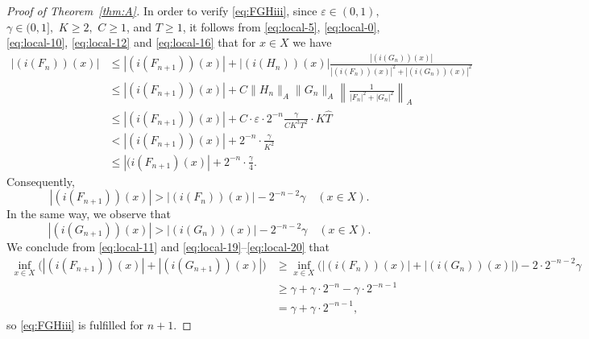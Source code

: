 \documentclass[12pt,fleqn]{amsart}
\theoremstyle{definition}
\numberwithin{equation}{section}
\theoremstyle{remark}
\newcommand{\e}{\varepsilon}
\begin{document}
\begin{proof}[Proof of Theorem~\ref{thm:A}]
In order to verify \eqref{eq:FGHiii}, since $\e \in(0,1),$  $\gamma \in(0,1],$ $K \geqslant 2,$ $C\geqslant 1$, and $T\geqslant 1$,
it follows from \eqref{eq:local-5}, \eqref{eq:local-0},
\eqref{eq:local-10}, \eqref{eq:local-12} and \eqref{eq:local-16} that for $x\in X$ we have
%
\begin{equation*}
    \begin{split}
        |(i(F_n))(x)|
        &\leq
        |(i(F_{n+1}))(x)|+|(i(H_n))(x)|\frac{|(i(G_n))(x)|}{|(i(F_n))(x)|^2+|(i(G_n))(x)|^2}\\
        &\leqslant 
        |(i(F_{n+1}))(x)|+ C\|H_n\|_A\|G_n\|_A
        \left\|\frac{1}{|F_n|^2+|G_n|^2}\right\|_A
        \\
        &\leqslant 
        |(i(F_{n+1}))(x)|+
        C \cdot \e\cdot 2^{-n}\frac{\gamma}{CK^3T^2}\cdot K\widehat{T}\\
        &<
        |(i(F_{n+1}))(x)|+2^{-n}\cdot\frac{\gamma}{K^2}\\
        &\leqslant
        |(i(F_{n+1})(x)|+2^{-n}\cdot\frac{\gamma}{4}.
    \end{split}
\end{equation*}
%
Consequently,
%
\begin{equation}\label{eq:local-19}
    |(i(F_{n+1}))(x)|>|(i(F_n))(x)|-2^{-n-2}\gamma \quad (x\in X).
\end{equation}
%
In the same way, we observe that
%
\begin{equation}\label{eq:local-20}
    |(i(G_{n+1}))(x)|>|(i(G_n))(x)|-2^{-n-2}\gamma \quad (x\in X).
\end{equation}
%
We conclude from \eqref{eq:local-11} and 
\eqref{eq:local-19}--\eqref{eq:local-20} that 
\begin{equation*}
    \begin{split}
        \inf_{x\in X}\big(|(i(F_{n+1}))(x)|+|(i(G_{n+1}))(x)|\big)
        &\geqslant 
        \inf_{x\in X}\big(|(i(F_{n}))(x)|+|(i(G_{n}))(x)|\big)
        -2\cdot 2^{-n-2}\gamma 
        \\
        &\geqslant 
        \gamma+\gamma\cdot 2^{-n}-\gamma\cdot 2^{-n-1}\\
        & =\gamma+\gamma\cdot 2^{-n-1},
    \end{split}
    \end{equation*}
%
so \eqref{eq:FGHiii} is fulfilled for $n+1$.


\end{proof}
\end{document}
